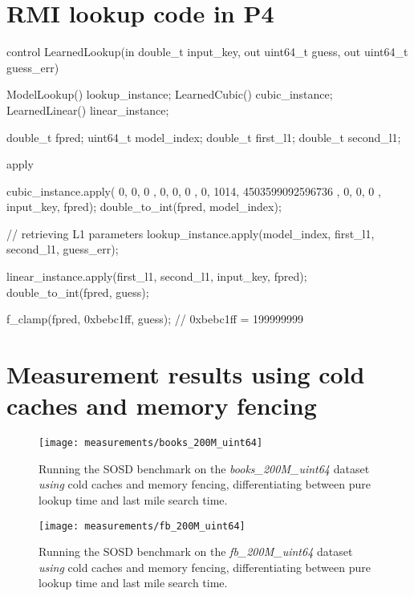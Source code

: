 \section{RMI lookup code in P4}
\label{sect:appendix:rmi_lookup}

\begin{P4}
control LearnedLookup(in double_t input_key, out uint64_t guess, out uint64_t guess_err) {
  ModelLookup() lookup_instance;
  LearnedCubic() cubic_instance;
  LearnedLinear() linear_instance;

  double_t fpred;
  uint64_t model_index;
  double_t first_l1; double_t second_l1;

  apply {
    cubic_instance.apply({ 0, 0, 0 }, { 0, 0, 0 }, { 0, 1014, 4503599092596736 }, { 0, 0, 0 }, input_key, fpred);
    double_to_int(fpred, model_index);

    // retrieving L1 parameters
    lookup_instance.apply(model_index, first_l1, second_l1, guess_err);

    linear_instance.apply(first_l1, second_l1, input_key, fpred);
    double_to_int(fpred, guess);

    f_clamp(fpred, 0xbebc1ff, guess); // 0xbebc1ff = 199999999
  }
}\end{P4}

\newpage %

\section{Measurement results using cold caches and memory fencing}
\label{sect:appendix:measurements}

\begin{figure}[!htb]
  \centering
  \texttt{[image: measurements/books\_200M\_uint64]}
  \caption*{
    Running the SOSD benchmark on the \emph{books\_200M\_uint64} dataset \emph{using} cold caches and memory fencing, differentiating between pure lookup time and last mile search time.
  }
\end{figure}

\begin{figure}[!htb]
  \centering
  \texttt{[image: measurements/fb\_200M\_uint64]}
  \caption*{
    Running the SOSD benchmark on the \emph{fb\_200M\_uint64} dataset \emph{using} cold caches and memory fencing, differentiating between pure lookup time and last mile search time.
  }
\end{figure}

